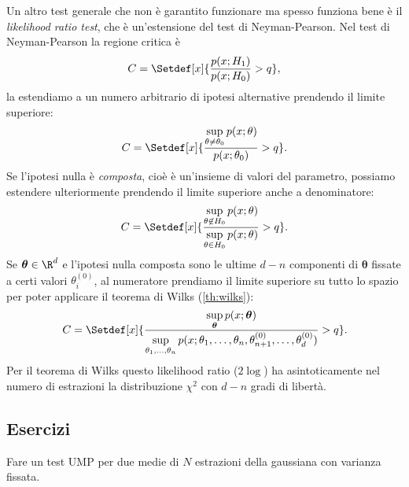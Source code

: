 Un altro test generale che non è garantito funzionare ma spesso funziona bene
è il \emph{likelihood ratio test}, che è un'estensione del test di Neyman-Pearson.
Nel test di Neyman-Pearson la regione critica è
\begin{equation*}
	C = \Setdef[x]{\frac{p(x;H_1)}{p(x;H_0)} > q},
\end{equation*}
la estendiamo a un numero arbitrario di ipotesi alternative prendendo il limite superiore:
\begin{equation*}
	C = \Setdef[x]{\frac {\sup\limits_{\theta\neq\theta_0} p(x;\theta)} {p(x;\theta_0)} > q}.
\end{equation*}
Se l'ipotesi nulla è \emph{composta},
cioè è un'insieme di valori del parametro,
possiamo estendere ulteriormente prendendo il limite superiore anche a denominatore:
\begin{equation*}
	C = \Setdef[x]{\frac {\sup\limits_{\theta\not\in H_0} p(x;\theta)} {\sup\limits_{\theta\in H_0} p(x;\theta)} > q}.
\end{equation*}
Se $\boldsymbol\theta\in\R^d$
e l'ipotesi nulla composta sono le ultime $d-n$ componenti di $\boldsymbol\theta$
fissate a certi valori $\theta_i^{(0)}$,
al numeratore prendiamo il limite superiore su tutto lo spazio
per poter applicare il teorema di Wilks (\autoref{th:wilks}):
\begin{equation*}
	C = \Setdef[x]{\frac
	{\sup\limits_{\boldsymbol\theta} p(x;\boldsymbol\theta)}
	{\sup\limits_{\theta_1,\dotsc,\theta_n} p(x;\theta_1,\dotsc,\theta_n,\theta_{n+1}^{(0)},\dotsc,\theta_d^{(0)})} > q}.
\end{equation*}
Per il teorema di Wilks
questo likelihood ratio ($2\log$) ha asintoticamente nel numero di estrazioni
la distribuzione $\chi^2$ con $d-n$ gradi di libertà.



\subsection{Esercizi}

\begin{exercise}
	Fare un test UMP per due medie di $N$ estrazioni della gaussiana con varianza fissata.
\end{exercise}

